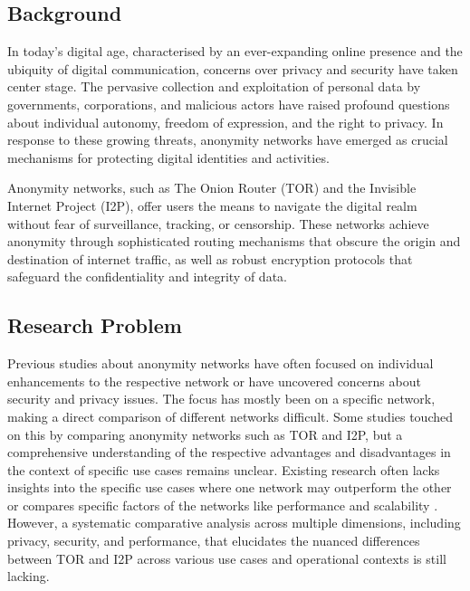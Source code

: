 \documentclass[12pt,conference]{IEEEtran}
\begin{document}
\subsection{Background}
In today's digital age, characterised by an ever-expanding online presence and the ubiquity of digital communication, concerns over privacy and security have taken center stage. The pervasive collection and exploitation of personal data by governments, corporations, and malicious actors have raised profound questions about individual autonomy, freedom of expression, and the right to privacy. In response to these growing threats, anonymity networks have emerged as crucial mechanisms for protecting digital identities and activities\cite{aComparativeStudyOnAnonymizingNetworks}.

Anonymity networks, such as The Onion Router (TOR)\cite{tor} and the Invisible Internet Project (I2P)\cite{i2p}, offer users the means to navigate the digital realm without fear of surveillance, tracking, or censorship\cite{aSurveyOnTORAndI2P}. These networks achieve anonymity through sophisticated routing mechanisms that obscure the origin and destination of internet traffic, as well as robust encryption protocols that safeguard the confidentiality and integrity of data\cite{aComparativeStudyOnAnonymizingNetworks}.

\subsection{Research Problem}
Previous studies about anonymity networks have often focused on individual enhancements to the respective network\cite{aReviewOnGarlicRoutingAndArtificialIntelligenceApplicatinsInPublicNetwork} or have uncovered concerns about security and privacy issues\cite{monitoringAnAnonymityNetwork}\cite{convenientDetectionMethodForAnonymousNetworks}. The focus has mostly been on a specific network, making a direct comparison of different networks difficult. Some studies touched on this by comparing anonymity networks such as TOR and I2P, but a comprehensive understanding of the respective advantages and disadvantages in the context of specific use cases remains unclear. Existing research often lacks insights into the specific use cases where one network may outperform the other\cite{TORVsI2P}\cite{aComparativeStudyOnAnonymizingNetworks} or compares specific factors of the networks like performance and scalability \cite{I2PUsabilityVsTORUsability}\cite{aSurveyOnTORAndI2P}. However, a systematic comparative analysis across multiple dimensions, including privacy, security, and performance, that elucidates the nuanced differences between TOR and I2P across various use cases and operational contexts is still lacking. 
\end{document}
